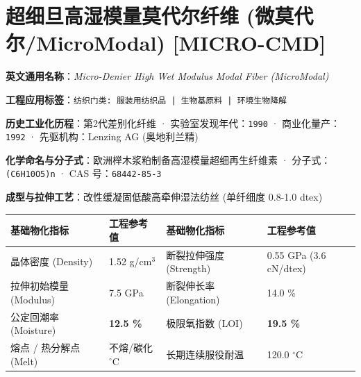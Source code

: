 \documentclass[11pt,openright,twoside,UTF8]{ctexbook}
\begin{document}
\section{超细旦高湿模量莫代尔纤维 (微莫代尔/MicroModal) [MICRO-CMD]}
\label{sec:micro-cmd}

\noindent\textbf{英文通用名称}：\textit{Micro-Denier High Wet Modulus Modal Fiber (MicroModal)}\par
\noindent\textbf{工程应用标签}：\texttt{纺织门类: 服装用纺织品 | 生物基原料 | 环境生物降解}\par
\noindent\textbf{历史工业化历程}：第2代差别化纤维 · 实验室发现年代：\texttt{1990} · 商业化量产：\texttt{1992} · 先驱机构：Lenzing AG (奥地利兰精)\par
\noindent\textbf{化学命名与分子式}：欧洲榉木浆粕制备高湿模量超细再生纤维素 · 分子式：\texttt{(C6H10O5)n} · CAS 号：\texttt{68442-85-3}\par
\noindent\textbf{成型与拉伸工艺}：改性缓凝固低酸高牵伸湿法纺丝 (单纤细度 0.8-1.0 dtex)\par

\vspace{0.15cm}
\begin{center}
\small
\begin{tabularx}{\textwidth}{p{3.8cm}Xp{3.8cm}X}
\toprule
\textbf{基础物化指标} & \textbf{工程参考值} & \textbf{基础物化指标} & \textbf{工程参考值} \\
\midrule
晶体密度 (Density) & 1.52 g/cm$^3$ & 断裂拉伸强度 (Strength) & 0.55 GPa (3.6 cN/dtex) \\
拉伸初始模量 (Modulus) & 7.5 GPa & 断裂伸长率 (Elongation) & 14.0 \% \\
公定回潮率 (Moisture) & \textbf{12.5 \%} & 极限氧指数 (LOI) & \textbf{19.5 \%} \\
熔点 / 热分解点 (Melt) & 不熔/碳化 $^\circ\mathrm{C}$ & 长期连续服役耐温 & 120.0 $^\circ\mathrm{C}$ \\
\bottomrule
\end{tabularx}
\end{center}
\vspace{0.15cm}
\end{document}
